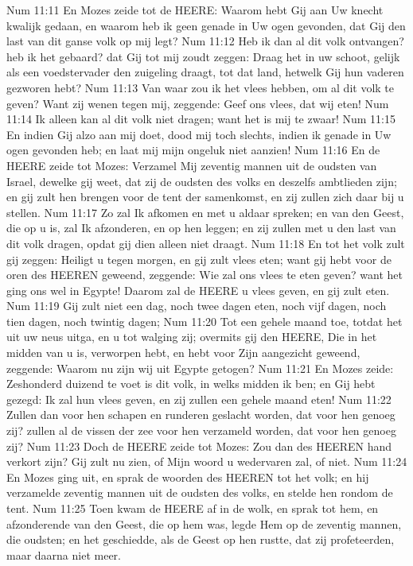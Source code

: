 Num 11:11  En Mozes zeide tot de HEERE: Waarom hebt Gij aan Uw knecht kwalijk gedaan, en waarom heb ik geen genade in Uw ogen gevonden, dat Gij den last van dit ganse volk op mij legt?
Num 11:12  Heb ik dan al dit volk ontvangen? heb ik het gebaard? dat Gij tot mij zoudt zeggen: Draag het in uw schoot, gelijk als een voedstervader den zuigeling draagt, tot dat land, hetwelk Gij hun vaderen gezworen hebt?
Num 11:13  Van waar zou ik het vlees hebben, om al dit volk te geven? Want zij wenen tegen mij, zeggende: Geef ons vlees, dat wij eten!
Num 11:14  Ik alleen kan al dit volk niet dragen; want het is mij te zwaar!
Num 11:15  En indien Gij alzo aan mij doet, dood mij toch slechts, indien ik genade in Uw ogen gevonden heb; en laat mij mijn ongeluk niet aanzien!
Num 11:16  En de HEERE zeide tot Mozes: Verzamel Mij zeventig mannen uit de oudsten van Israel, dewelke gij weet, dat zij de oudsten des volks en deszelfs ambtlieden zijn; en gij zult hen brengen voor de tent der samenkomst, en zij zullen zich daar bij u stellen.
Num 11:17  Zo zal Ik afkomen en met u aldaar spreken; en van den Geest, die op u is, zal Ik afzonderen, en op hen leggen; en zij zullen met u den last van dit volk dragen, opdat gij dien alleen niet draagt.
Num 11:18  En tot het volk zult gij zeggen: Heiligt u tegen morgen, en gij zult vlees eten; want gij hebt voor de oren des HEEREN geweend, zeggende: Wie zal ons vlees te eten geven? want het ging ons wel in Egypte! Daarom zal de HEERE u vlees geven, en gij zult eten.
Num 11:19  Gij zult niet een dag, noch twee dagen eten, noch vijf dagen, noch tien dagen, noch twintig dagen;
Num 11:20  Tot een gehele maand toe, totdat het uit uw neus uitga, en u tot walging zij; overmits gij den HEERE, Die in het midden van u is, verworpen hebt, en hebt voor Zijn aangezicht geweend, zeggende: Waarom nu zijn wij uit Egypte getogen?
Num 11:21  En Mozes zeide: Zeshonderd duizend te voet is dit volk, in welks midden ik ben; en Gij hebt gezegd: Ik zal hun vlees geven, en zij zullen een gehele maand eten!
Num 11:22  Zullen dan voor hen schapen en runderen geslacht worden, dat voor hen genoeg zij? zullen al de vissen der zee voor hen verzameld worden, dat voor hen genoeg zij?
Num 11:23  Doch de HEERE zeide tot Mozes: Zou dan des HEEREN hand verkort zijn? Gij zult nu zien, of Mijn woord u wedervaren zal, of niet.
Num 11:24  En Mozes ging uit, en sprak de woorden des HEEREN tot het volk; en hij verzamelde zeventig mannen uit de oudsten des volks, en stelde hen rondom de tent.
Num 11:25  Toen kwam de HEERE af in de wolk, en sprak tot hem, en afzonderende van den Geest, die op hem was, legde Hem op de zeventig mannen, die oudsten; en het geschiedde, als de Geest op hen rustte, dat zij profeteerden, maar daarna niet meer.

